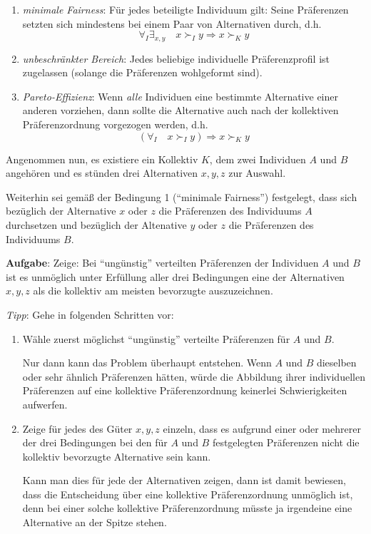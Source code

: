 \begin{enumerate}
  \item {\em minimale Fairness}: Für jedes beteiligte Individuum gilt: Seine
  Präferenzen setzten sich mindestens bei einem Paar von Alternativen durch,
  d.h. \[ \forall_I \exists_{x,y} \quad x \succ_I y \Rightarrow x \succ_K y \]
  \item {\em unbeschränkter Bereich}: Jedes beliebige individuelle
  Präferenzprofil ist zugelassen (solange die Präferenzen wohlgeformt sind).
  \item {\em Pareto-Effizienz}: Wenn {\em alle} Individuen eine bestimmte
  Alternative einer anderen vorziehen, dann sollte die Alternative auch nach der
  kollektiven Präferenzordnung vorgezogen werden, d.h.
  \[ (\forall_I \quad x \succ_I y) \Rightarrow x \succ_K y \]
\end{enumerate}

Angenommen nun, es existiere ein Kollektiv $K$, dem zwei Individuen $A$
und $B$ angehören und es stünden drei Alternativen $x,y,z$ zur Auswahl.

Weiterhin sei gemäß der Bedingung 1 ("`minimale Fairness"') festgelegt, dass
sich bezüglich der Alternative $x$ oder $z$ die Präferenzen des Individuums $A$
durchsetzen und bezüglich der Altenative $y$ oder $z$ die Präferenzen des
Individuums $B$. 


\vspace{0.5cm}

{\bf Aufgabe}: Zeige: Bei "`ungünstig"' verteilten Präferenzen der
Individuen $A$ und $B$ ist es unmöglich unter Erfüllung aller drei
Bedingungen eine der Alternativen $x,y,z$ als die kollektiv am meisten
bevorzugte auszuzeichnen.

\vspace{1cm}

{\em Tipp}: Gehe in folgenden Schritten vor:
\begin{enumerate}
  \item Wähle zuerst möglichst "`ungünstig"' verteilte Präferenzen für $A$ und
  $B$.
 
  {\footnotesize Nur dann kann das Problem überhaupt entstehen. Wenn $A$ und
  $B$ dieselben oder sehr ähnlich Präferenzen hätten, würde die Abbildung ihrer
  individuellen Präferenzen auf eine kollektive Präferenzordnung keinerlei
  Schwierigkeiten aufwerfen.}

  \item Zeige für jedes des Güter $x,y,z$ einzeln, dass es aufgrund einer oder
  mehrerer der drei Bedingungen bei den für $A$ und $B$ festgelegten
  Präferenzen nicht die kollektiv bevorzugte Alternative sein kann.
  
  {\footnotesize Kann man dies für jede der Alternativen zeigen, dann ist damit
  bewiesen, dass die Entscheidung über eine kollektive Präferenzordnung
  unmöglich ist, denn bei einer solche kollektive Präferenzordnung müsste ja
  irgendeine eine Alternative an der Spitze stehen.}
\end{enumerate}

